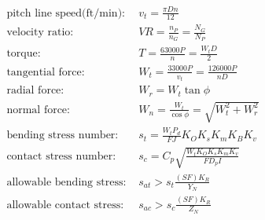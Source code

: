 \documentclass[11pt, fleqn]{article}
\begin{document}
\begin{align*}
    \text{pitch line speed(ft/min): }&v_t=\frac{\pi D n}{12}\\
    \text{velocity ratio: }&VR=\frac{n_P}{n_G}=\frac{N_G}{N_P}\\
    \text{torque: }&T=\frac{63000P}{n}=\frac{W_tD}{2}\\
    \text{tangential force: }&W_t=\frac{33000P}{v_t}=\frac{126000P}{nD}\\
    \text{radial force: }&W_r=W_t\tan\phi\\
    \text{normal force: }&W_n=\frac{W_t}{\cos\phi}=\sqrt{W_t^2+W_r^2}\\
    \text{bending stress number: }&s_t=\frac{W_tP_d}{FJ}K_OK_sK_mK_BK_v\\
    \text{contact stress number: }&s_c=C_p\sqrt{\frac{W_tK_OK_sK_mK_v}{FD_pI}}\\
    \text{allowable bending stress: }&s_{at}>s_t\frac{(SF)K_R}{Y_N}\\
    \text{allowable contact stress: }&s_{ac}>s_c\frac{(SF)K_R}{Z_N}
\end{align*}
\end{document}
